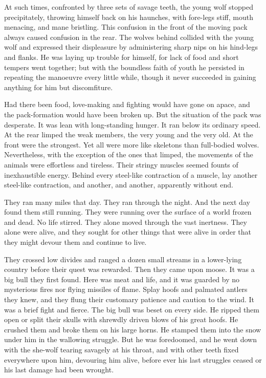 \documentclass[10pt]{book}
\begin{document}
At such times, confronted by three sets of savage teeth, the young wolf
stopped precipitately, throwing himself back on his haunches, with
fore-legs stiff, mouth menacing, and mane bristling. This confusion in
the front of the moving pack always caused confusion in the rear. The
wolves behind collided with the young wolf and expressed their
displeasure by administering sharp nips on his hind-legs and flanks. He
was laying up trouble for himself, for lack of food and short tempers
went together; but with the boundless faith of youth he persisted in
repeating the manoeuvre every little while, though it never succeeded
in gaining anything for him but discomfiture.

Had there been food, love-making and fighting would have gone on apace,
and the pack-formation would have been broken up. But the situation of
the pack was desperate. It was lean with long-standing hunger. It ran
below its ordinary speed. At the rear limped the weak members, the very
young and the very old. At the front were the strongest. Yet all were
more like skeletons than full-bodied wolves. Nevertheless, with the
exception of the ones that limped, the movements of the animals were
effortless and tireless. Their stringy muscles seemed founts of
inexhaustible energy. Behind every steel-like contraction of a muscle,
lay another steel-like contraction, and another, and another,
apparently without end.

They ran many miles that day. They ran through the night. And the next
day found them still running. They were running over the surface of a
world frozen and dead. No life stirred. They alone moved through the
vast inertness. They alone were alive, and they sought for other things
that were alive in order that they might devour them and continue to
live.

They crossed low divides and ranged a dozen small streams in a
lower-lying country before their quest was rewarded. Then they came
upon moose. It was a big bull they first found. Here was meat and life,
and it was guarded by no mysterious fires nor flying missiles of flame.
Splay hoofs and palmated antlers they knew, and they flung their
customary patience and caution to the wind. It was a brief fight and
fierce. The big bull was beset on every side. He ripped them open or
split their skulls with shrewdly driven blows of his great hoofs. He
crushed them and broke them on his large horns. He stamped them into
the snow under him in the wallowing struggle. But he was foredoomed,
and he went down with the she-wolf tearing savagely at his throat, and
with other teeth fixed everywhere upon him, devouring him alive, before
ever his last struggles ceased or his last damage had been wrought.
\end{document}
